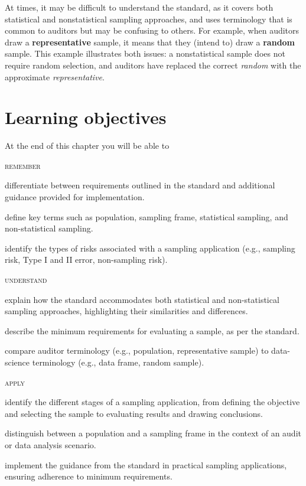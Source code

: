 \bigskip
At times, it may be difficult to understand the standard, as it covers both statistical and nonstatistical sampling approaches, and uses terminology that is common to auditors but may be confusing to others. For example, when auditors draw a \textbf{representative} sample, it means that they (intend to) draw a \textbf{random} sample. This example illustrates both issues: a nonstatistical sample does not require random selection, and auditors have replaced the correct \emph{random} with the approximate \emph{representative}.

\section*{Learning objectives}
At the end of this chapter you will be able to

\textsc{remember}
\begin{compactitem}
\item differentiate between requirements outlined in the standard and additional guidance provided for implementation.
\item define key terms such as population, sampling frame, statistical sampling, and non-statistical sampling.
\item identify the types of risks associated with a sampling application (e.g., sampling risk, Type I and II error, non-sampling risk).
\end{compactitem}

\textsc{understand}

\begin{compactitem}
\item explain how the standard accommodates both statistical and non-statistical sampling approaches, highlighting their similarities and differences.
\item describe the minimum requirements for evaluating a sample, as per the standard.
\item compare auditor terminology (e.g., population, representative sample) to data-science terminology (e.g., data frame, random sample).
\end{compactitem}

\textsc{apply}

\begin{compactitem}
\item identify the different stages of a sampling application, from defining the objective and selecting the sample to evaluating results and drawing conclusions.
\item distinguish between a population and a sampling frame in the context of an audit or data analysis scenario.
\item implement the guidance from the standard in practical sampling applications, ensuring adherence to minimum requirements.
\end{compactitem}

